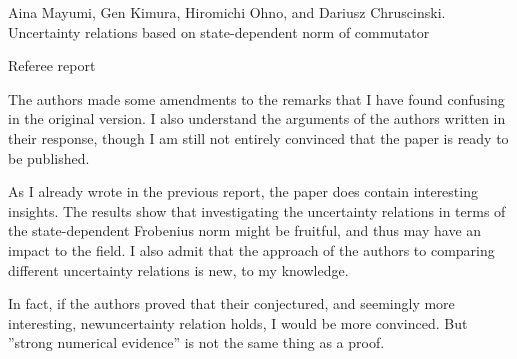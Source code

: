 \documentclass[12pt]{article}
\begin{document}
\begin{center}
{\large Aina Mayumi, Gen Kimura, Hiromichi Ohno, and Dariusz Chruscinski. Uncertainty relations based on state-dependent norm of commutator
 }

\end{center}
\medskip

\centerline{Referee report}

\bigskip


The authors made some amendments to the remarks that I have found confusing in the original version. I also understand the arguments of the authors written in their response, though I am still not entirely convinced that the paper is ready to be published.

As I already wrote in the previous report, the paper does contain interesting insights. The results show that investigating the uncertainty relations in terms of the state-dependent Frobenius norm might be fruitful,
and thus may have an impact to the field. I also admit that the approach of the authors to comparing different uncertainty relations is new,  to my knowledge.  

In fact, if the authors proved that their conjectured, and seemingly more interesting, newuncertainty relation holds, I would be more convinced. But ''strong numerical evidence'' is not the same thing as a proof.
\end{document}
